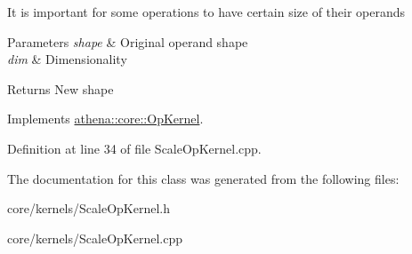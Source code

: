 It is important for some operations to have certain size of their operands 
\begin{DoxyParams}{Parameters}
{\em shape} & Original operand shape \\
\hline
{\em dim} & Dimensionality \\
\hline
\end{DoxyParams}
\begin{DoxyReturn}{Returns}
New shape 
\end{DoxyReturn}


Implements \mbox{\hyperlink{classathena_1_1core_1_1_op_kernel_a762e541463ffd089b47a8e6755c30fe1}{athena\+::core\+::\+Op\+Kernel}}.



Definition at line 34 of file Scale\+Op\+Kernel.\+cpp.



The documentation for this class was generated from the following files\+:\begin{DoxyCompactItemize}
\item 
core/kernels/Scale\+Op\+Kernel.\+h\item 
core/kernels/Scale\+Op\+Kernel.\+cpp\end{DoxyCompactItemize}
